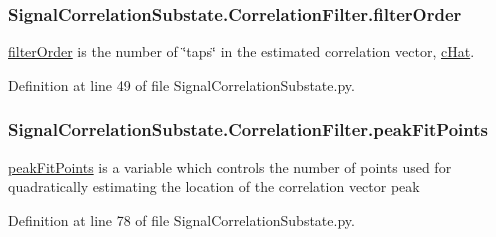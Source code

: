 \subsubsection[{\texorpdfstring{filter\+Order}{filterOrder}}]{\setlength{\rightskip}{0pt plus 5cm}Signal\+Correlation\+Substate.\+Correlation\+Filter.\+filter\+Order}\hypertarget{classSignalCorrelationSubstate_1_1CorrelationFilter_a4b49b7bd52c1346cca0342942a5bbbb6}{}\label{classSignalCorrelationSubstate_1_1CorrelationFilter_a4b49b7bd52c1346cca0342942a5bbbb6}


\hyperlink{classSignalCorrelationSubstate_1_1CorrelationFilter_a4b49b7bd52c1346cca0342942a5bbbb6}{filter\+Order} is the number of \char`\"{}taps\char`\"{} in the estimated correlation vector, \hyperlink{classSignalCorrelationSubstate_1_1CorrelationFilter_ad07b1d484b9ab77a1a8fc215f10faf15}{c\+Hat}. 



Definition at line 49 of file Signal\+Correlation\+Substate.\+py.

\subsubsection[{\texorpdfstring{peak\+Fit\+Points}{peakFitPoints}}]{\setlength{\rightskip}{0pt plus 5cm}Signal\+Correlation\+Substate.\+Correlation\+Filter.\+peak\+Fit\+Points}\hypertarget{classSignalCorrelationSubstate_1_1CorrelationFilter_a85a73739e9bb0a7f20886a812a3afa83}{}\label{classSignalCorrelationSubstate_1_1CorrelationFilter_a85a73739e9bb0a7f20886a812a3afa83}


\hyperlink{classSignalCorrelationSubstate_1_1CorrelationFilter_a85a73739e9bb0a7f20886a812a3afa83}{peak\+Fit\+Points} is a variable which controls the number of points used for quadratically estimating the location of the correlation vector peak 



Definition at line 78 of file Signal\+Correlation\+Substate.\+py.

